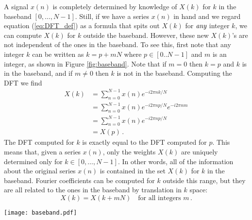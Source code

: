 
A signal $x(n)$ is completely determined by knowledge of $X(k)$ for $k$ in the baseband $[0,\ldots,N-1]$.
Still, if we have a series $x(n)$ in hand and we regard equation (\ref{eq:DFT_def}) as a formula that spits out $X(k)$ for $\emph{any}$ integer $k$, we can compute $X(k)$ for $k$ outside the baseband.
However, these new $X(k)$'s are not independent of the ones in the baseband.
To see this, first note that any integer $k$ can be written as $k=p+mN$ where $p \in [0..N-1]$ and $m$ is an integer, as shown in Figure \ref{fig:baseband}.
Note that if $m=0$ then $k=p$ and $k$ is in the baseband, and if $m \neq 0$ then $k$ is not in the baseband.
Computing the DFT we find
\begin{align}
X(k) &= \sum_{n=0}^{N-1} x(n) e^{-i2\pi nk/N}\\
&= \sum_{n=0}^{N-1} x(n) e^{-i2\pi np/N} e^{-i2\pi nm} \\
&= \sum_{n=0}^{N-1} x(n)e^{-i2\pi np/N} \\
&= X(p) \, .
\end{align}
The DFT computed for $k$ is exactly equal to the DFT computed for $p$.
This means that, given a series $x(n)$, only the weights $X(k)$ are uniquely determined only for $k \in [0, \ldots , N-1]$.
In other words, all of the information about the original series $x(n)$ is contained in the set $X(k)$ for $k$ in the baseband.
Fourier coefficients can be computed for $k$ outside this range, but they are all related to the ones in the baseband by translation in $k$ space:
\begin{equation}
X(k) = X(k+mN) \quad \textrm{for all integers }m \, . \label{eq:translational_symmetry}
\end{equation}

\begin{figure*}[t]
\begin{centering}
\texttt{[image: baseband.pdf]}
\par\end{centering}
\caption{Illustration of the baseband and higher bands.}
\label{fig:baseband}
\end{figure*}



